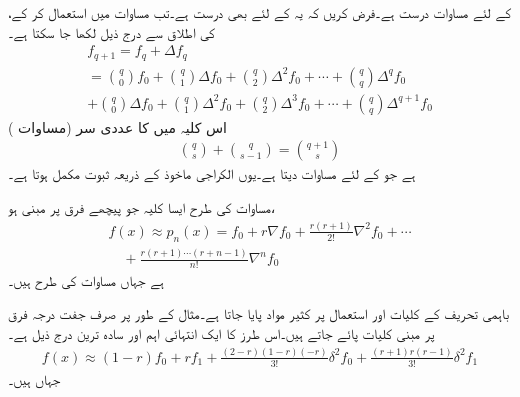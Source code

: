   کے لئے مساوات  درست ہے۔فرض کریں کہ یہ   کے لئے بھی درست ہے۔تب مساوات  میں  استعمال کر کے،  کی اطلاق سے درج ذیل لکھا جا سکتا ہے۔
\begin{multline*}
f_{q+1}=f_q+\Delta f_q\\
=\binom{q}{0}f_0+\binom{q}{1} \Delta f_0+\binom{q}{2}\Delta^2 f_0+\cdots +\binom{q}{q}\Delta^q f_0\\
+\binom{q}{0}\Delta f_0+\binom{q}{1}\Delta^2 f_0+\binom{q}{2}\Delta^3 f_0+\cdots +\binom{q}{q}\Delta^{q+1} f_0
\end{multline*}
اس کلیہ میں  کا عددی سر (مساوات )
\begin{align*}
\binom{q}{s}+\binom{q}{s-1}=\binom{q+1}{s}
\end{align*}
ہے جو  کے لئے مساوات  دیتا ہے۔یوں الکراجی ماخوذ کے ذریعہ ثبوت مکمل ہوتا ہے۔

مساوات  کی طرح ایسا کلیہ جو پیچھے فرق پر مبنی ہو،  
\begin{multline}\label{مساوات_اعدادی_نیوٹن_باہمی_تحریف_پیچھے}
f(x)\approx p_n(x)=f_0+r\nabla f_0+\frac{r(r+1)}{2!}\nabla^2 f_0+\cdots\\
\quad +\frac{r(r+1)\cdots (r+n-1)}{n!}\nabla ^n f_0
\end{multline}
ہے جہاں مساوات  کی طرح  ہیں۔

باہمی تحریف کے کلیات اور استعمال پر کثیر مواد پایا جاتا ہے۔مثال کے طور پر  صرف جفت درجہ فرق پر مبنی کلیات پائے جاتے ہیں۔اس طرز کا ایک انتہائی اہم اور  سادہ ترین   درج ذیل ہے۔
\begin{align}\label{مساوات_اعدادی_کلیہ_ایورٹ}
f(x)\approx (1-r)f_0+rf_1+\frac{(2-r)(1-r)(-r)}{3!}\delta^2f_0+\frac{(r+1)r(r-1)}{3!}\delta^2f_1
\end{align}   
جہاں  ہیں۔

